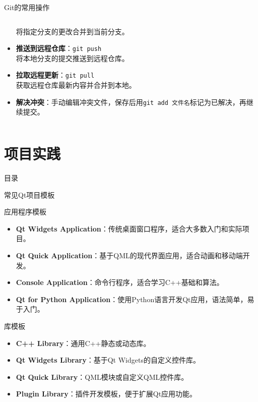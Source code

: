 \documentclass[UTF8,aspectratio=169]{beamer}
\begin{document}
\begin{frame}{Git的常用操作}
\begin{columns}
\begin{column}{0.48\textwidth}
\begin{itemize}
                    将指定分支的更改合并到当前分支。
                \item \textbf{推送到远程仓库}：\texttt{git push} \\
                    将本地分支的提交推送到远程仓库。
                \item \textbf{拉取远程更新}：\texttt{git pull} \\
                    获取远程仓库最新内容并合并到本地。
                \item \textbf{解决冲突}：手动编辑冲突文件，保存后用\texttt{git add 文件名}标记为已解决，再继续提交。
            \end{itemize}
        \end{column}
    \end{columns}
\end{frame}

\section{项目实践}
\begin{frame}{目录}
    \begin{multicols}{2}
        \tableofcontents[currentsection]
    \end{multicols}
\end{frame}

\begin{frame}{常见Qt项目模板}
    \begin{ytublock}{应用程序模板}
        \begin{itemize}
            \item \textbf{Qt Widgets Application}：传统桌面窗口程序，适合大多数入门和实际项目。
            \item \textbf{Qt Quick Application}：基于QML的现代界面应用，适合动画和移动端开发。
            \item \textbf{Console Application}：命令行程序，适合学习C++基础和算法。
            \item \textbf{Qt for Python Application}：使用Python语言开发Qt应用，语法简单，易于入门。
        \end{itemize}
    \end{ytublock}
    \begin{ytublock}{库模板}
        \begin{itemize}
            \item \textbf{C++ Library}：通用C++静态或动态库。
            \item \textbf{Qt Widgets Library}：基于Qt Widgets的自定义控件库。
            \item \textbf{Qt Quick Library}：QML模块或自定义QML控件库。
            \item \textbf{Plugin Library}：插件开发模板，便于扩展Qt应用功能。
        \end{itemize}
    \end{ytublock}
\end{frame}
\end{document}
